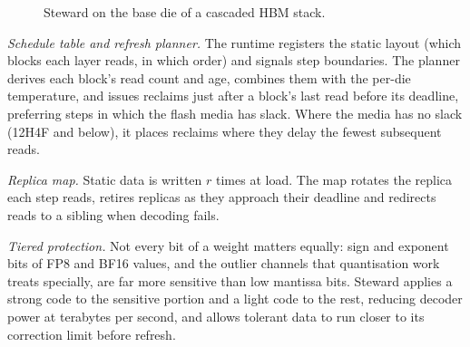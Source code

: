 \documentclass[conference,10pt]{IEEEtran}
\newcommand{\sys}{Steward}
\begin{document}
\begin{figure}[t]
\centering
{}
\caption{\sys{} on the base die of a cascaded HBM stack.}
\label{fig:steward}
\end{figure}

\textit{Schedule table and refresh planner.} The runtime registers the static
layout (which blocks each layer reads, in which order) and signals step
boundaries. The planner derives each block's read count and age, combines them
with the per-die temperature, and issues reclaims just after a block's last read
before its deadline, preferring steps in which the flash media has slack.
Where the media has no slack (12H4F and below), it places reclaims where they
delay the fewest subsequent reads.

\textit{Replica map.} Static data is written $r$ times at load. The map rotates
the replica each step reads, retires replicas as they approach their deadline
and redirects reads to a sibling when decoding fails.

\textit{Tiered protection.} Not every bit of a weight matters equally: sign and
exponent bits of FP8 and BF16 values, and the outlier channels that quantisation
work treats specially, are far more sensitive than low mantissa bits. \sys{}
applies a strong code to the sensitive portion and a light code to the rest,
reducing decoder power at terabytes per second, and allows tolerant data to run
closer to its correction limit before refresh.
\end{document}
